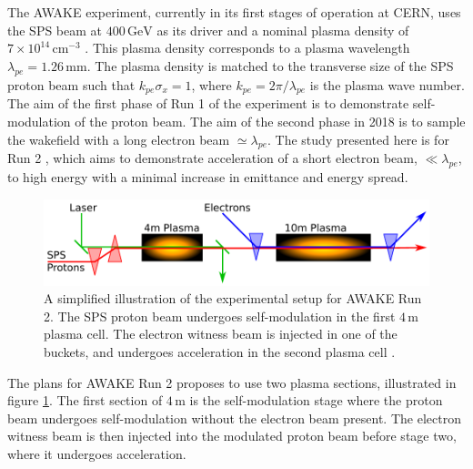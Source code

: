\documentclass[aps,prstab,reprint,amsmath,amssymb,groupedaddress]{revtex4-1}
\newcommand{\unit}[1]{\,\mathrm{#1}}
\newcommand{\nexp}[1]{\times 10^{#1}}
\begin{document}
The AWAKE experiment, currently in its first stages of operation at CERN, uses the SPS beam at $400\unit{GeV}$ as its
driver and a nominal plasma density of $7\nexp{14}\unit{cm}^{-3}$ \cite{gschwendtner:2016}. This plasma density
corresponds to a plasma wavelength $\lambda_{pe} = 1.26\unit{mm}$. The plasma density is matched to the transverse size
of the SPS proton beam such that $k_{pe}\sigma_{x} = 1$, where $k_{pe} = 2\pi/\lambda_{pe}$ is the plasma wave number.
The aim of the first phase of Run 1 of the experiment is to demonstrate self-modulation of the proton beam. The aim of
the second phase in 2018 is to sample the wakefield with a long electron beam $\simeq\lambda_{pe}$. The study presented
here is for Run 2 \cite{adli:2016}, which aims to demonstrate acceleration of a short electron beam, $\ll\lambda_{pe}$,
to high energy with a minimal increase in emittance and energy spread.

\begin{figure}[hbt]
    \includegraphics[width=0.99\linewidth,trim={1mm 2mm 1mm 2mm},clip]{figures/figAWAKE}
    \caption{\label{Fig:AWAKER2} A simplified illustration of the experimental setup for AWAKE Run 2. The SPS proton
        beam undergoes self-modulation in the first $4\unit{m}$ plasma cell. The electron witness beam is injected in
        one of the buckets, and undergoes acceleration in the second plasma cell \cite{berglyd_olsen:2015, adli:2016}.}
\end{figure}

The plans for AWAKE Run 2 proposes to use two plasma sections, illustrated in figure \ref{Fig:AWAKER2}. The first
section of $4\unit{m}$ is the self-modulation stage where the proton beam undergoes self-modulation without the electron
beam present. The electron witness beam is then  injected into the modulated proton beam before stage two, where it
undergoes acceleration.
\end{document}
